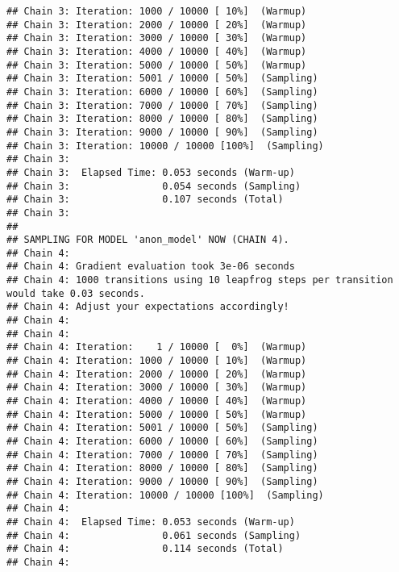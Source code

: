\documentclass[
]{article}
\newenvironment{Shaded}{\begin{snugshade}}{\end{snugshade}}
\newcommand{\AttributeTok}[1]{\textcolor[rgb]{0.77,0.63,0.00}{#1}}
\newcommand{\FunctionTok}[1]{\textcolor[rgb]{0.00,0.00,0.00}{#1}}
\newcommand{\NormalTok}[1]{#1}
\newcommand{\OtherTok}[1]{\textcolor[rgb]{0.56,0.35,0.01}{#1}}
\newcommand{\SpecialCharTok}[1]{\textcolor[rgb]{0.00,0.00,0.00}{#1}}
\newcommand{\StringTok}[1]{\textcolor[rgb]{0.31,0.60,0.02}{#1}}
\begin{document}
\begin{verbatim}
## Chain 3: Iteration: 1000 / 10000 [ 10%]  (Warmup)
## Chain 3: Iteration: 2000 / 10000 [ 20%]  (Warmup)
## Chain 3: Iteration: 3000 / 10000 [ 30%]  (Warmup)
## Chain 3: Iteration: 4000 / 10000 [ 40%]  (Warmup)
## Chain 3: Iteration: 5000 / 10000 [ 50%]  (Warmup)
## Chain 3: Iteration: 5001 / 10000 [ 50%]  (Sampling)
## Chain 3: Iteration: 6000 / 10000 [ 60%]  (Sampling)
## Chain 3: Iteration: 7000 / 10000 [ 70%]  (Sampling)
## Chain 3: Iteration: 8000 / 10000 [ 80%]  (Sampling)
## Chain 3: Iteration: 9000 / 10000 [ 90%]  (Sampling)
## Chain 3: Iteration: 10000 / 10000 [100%]  (Sampling)
## Chain 3: 
## Chain 3:  Elapsed Time: 0.053 seconds (Warm-up)
## Chain 3:                0.054 seconds (Sampling)
## Chain 3:                0.107 seconds (Total)
## Chain 3: 
## 
## SAMPLING FOR MODEL 'anon_model' NOW (CHAIN 4).
## Chain 4: 
## Chain 4: Gradient evaluation took 3e-06 seconds
## Chain 4: 1000 transitions using 10 leapfrog steps per transition would take 0.03 seconds.
## Chain 4: Adjust your expectations accordingly!
## Chain 4: 
## Chain 4: 
## Chain 4: Iteration:    1 / 10000 [  0%]  (Warmup)
## Chain 4: Iteration: 1000 / 10000 [ 10%]  (Warmup)
## Chain 4: Iteration: 2000 / 10000 [ 20%]  (Warmup)
## Chain 4: Iteration: 3000 / 10000 [ 30%]  (Warmup)
## Chain 4: Iteration: 4000 / 10000 [ 40%]  (Warmup)
## Chain 4: Iteration: 5000 / 10000 [ 50%]  (Warmup)
## Chain 4: Iteration: 5001 / 10000 [ 50%]  (Sampling)
## Chain 4: Iteration: 6000 / 10000 [ 60%]  (Sampling)
## Chain 4: Iteration: 7000 / 10000 [ 70%]  (Sampling)
## Chain 4: Iteration: 8000 / 10000 [ 80%]  (Sampling)
## Chain 4: Iteration: 9000 / 10000 [ 90%]  (Sampling)
## Chain 4: Iteration: 10000 / 10000 [100%]  (Sampling)
## Chain 4: 
## Chain 4:  Elapsed Time: 0.053 seconds (Warm-up)
## Chain 4:                0.061 seconds (Sampling)
## Chain 4:                0.114 seconds (Total)
## Chain 4:
\end{verbatim}

\begin{Shaded}
\end{Shaded}
\end{document}

